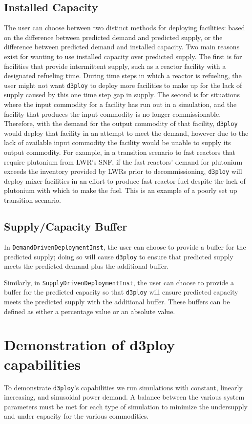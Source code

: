 \documentclass[11pt,letterpaper]{article}
\newcommand{\deploy}{\texttt{d3ploy}\xspace}%
\begin{document}
\subsection{\textbf{Installed Capacity}}
The user can choose between two distinct methods for deploying facilities: based on the difference 
between predicted demand and predicted supply, or the difference between predicted demand and 
installed capacity. 
Two main reasons exist for wanting to use installed capacity over predicted 
supply. 
The first is for facilities that provide intermittent supply, such as a 
reactor facility with a designated refueling time. 
During time steps in which a reactor is refueling, the user might not 
want \deploy to deploy more facilities to make up for the lack of supply
caused by this one time step gap in supply. 
The second is for situations where the input commodity for a facility has
run out in a simulation, and the facility that produces the input commodity 
is no longer commissionable. 
Therefore, with the demand for the output commodity of that facility, \deploy
would deploy that facility in an attempt to meet the demand, however due to the lack of 
available input commodity the facility would be unable to supply its output commodity. 
For example, in a transition scenario to fast reactors that require plutonium 
from \gls{LWR}'s \gls{SNF}, if the fast reactors' demand for plutonium exceeds
the inventory provided by \gls{LWR}s prior to decommissioning, \deploy
will deploy mixer facilities in an effort to produce fast reactor 
fuel despite the lack of plutonium with which to make the fuel. 
This is an example of a poorly set up transition scenario. 

\subsection{\textbf{Supply/Capacity Buffer}}
In \texttt{DemandDrivenDeploymentInst}, the user can choose to provide a
buffer for the predicted supply; doing so will cause \deploy to ensure that predicted supply meets the predicted demand plus the 
additional buffer. 

Similarly, in \texttt{SupplyDrivenDeploymentInst}, the user can choose to 
provide a buffer for the predicted capacity so that \deploy will 
ensure predicted capacity meets the predicted supply with the 
additional buffer. 
These buffers can be defined as either a percentage value or an absolute value.  

\section{Demonstration of d3ploy capabilities}
To demonstrate \deploy's capabilities we run simulations with
constant, linearly increasing, and sinusoidal power demand.
A balance between the various system parameters must be 
met for each type of simulation to minimize the undersupply
and under capacity for the various commodities. 
\end{document}
